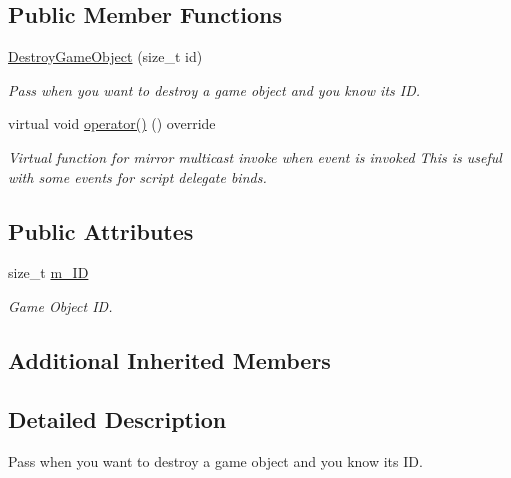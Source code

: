 \subsection*{Public Member Functions}
\begin{DoxyCompactItemize}
\item 
\hyperlink{classDestroyGameObject_a4ad0cb0d8adb8251c74b49ea99c282ad}{Destroy\+Game\+Object} (size\+\_\+t id)
\begin{DoxyCompactList}\small\item\em Pass when you want to destroy a game object and you know it\textquotesingle{}s ID. \end{DoxyCompactList}\item 
\mbox{\label{classDestroyGameObject_ad4128e4065e6f5ec7c4cbb5445c553ed}} 
virtual void \hyperlink{classDestroyGameObject_ad4128e4065e6f5ec7c4cbb5445c553ed}{operator()} () override
\begin{DoxyCompactList}\small\item\em Virtual function for mirror multicast invoke when event is invoked This is useful with some events for script delegate binds. \end{DoxyCompactList}\end{DoxyCompactItemize}
\subsection*{Public Attributes}
\begin{DoxyCompactItemize}
\item 
\mbox{\label{classDestroyGameObject_aa47e98e5b08d4fbb188bf9cdd1c7c9f3}} 
size\+\_\+t \hyperlink{classDestroyGameObject_aa47e98e5b08d4fbb188bf9cdd1c7c9f3}{m\+\_\+\+ID}
\begin{DoxyCompactList}\small\item\em Game Object ID. \end{DoxyCompactList}\end{DoxyCompactItemize}
\subsection*{Additional Inherited Members}


\subsection{Detailed Description}
Pass when you want to destroy a game object and you know it\textquotesingle{}s ID. 


